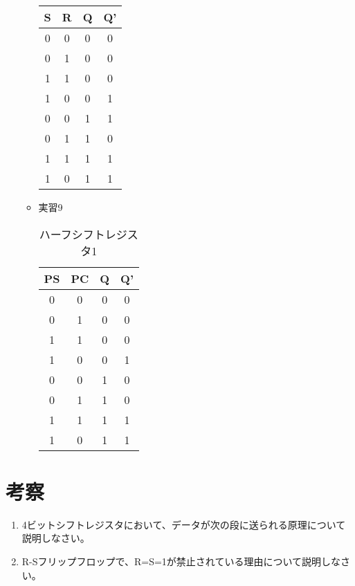 \documentclass[dvipdfmx]{jsarticle}
\begin{document}
\begin{enumerate}
\begin{itemize}
\begin{table}[H]
\begin{tabular}{|c|c|c|c|}
								S & R & Q & Q'\\ \hline
								0 & 0 & 0 & 0 \\ \hline
								0 & 1 & 0 & 0 \\ \hline
								1 & 1 & 0 & 0 \\ \hline
								1 & 0 & 0 & 1 \\ \hline
								0 & 0 & 1 & 1 \\ \hline
								0 & 1 & 1 & 0 \\ \hline
								1 & 1 & 1 & 1 \\ \hline
								1 & 0 & 1 & 1 \\ \hline
							\end{tabular}
						\end{table}
					\item 実習9
						\begin{table}[H]
							\center
							\caption{ハーフシフトレジスタ1}
							\begin{tabular}{|c|c|c|c|}
								\hline
								PS & PC & Q & Q'\\ \hline
								0 & 0 & 0 & 0 \\ \hline
								0 & 1 & 0 & 0 \\ \hline
								1 & 1 & 0 & 0 \\ \hline
								1 & 0 & 0 & 1 \\ \hline
								0 & 0 & 1 & 0 \\ \hline
								0 & 1 & 1 & 0 \\ \hline
								1 & 1 & 1 & 1 \\ \hline
								1 & 0 & 1 & 1 \\ \hline
							\end{tabular}
						\end{table}
				\end{itemize}
		\end{enumerate}
	\section{考察}
		\begin{enumerate}
			\item 4ビットシフトレジスタにおいて、データが次の段に送られる原理について説明しなさい。
			\item R-Sフリップフロップで、R=S=1が禁止されている理由について説明しなさい。
		\end{enumerate}
\end{document}
